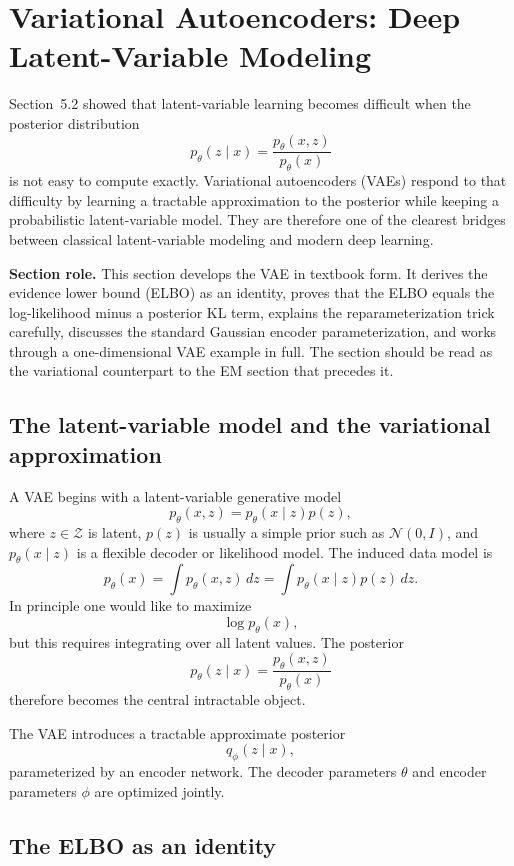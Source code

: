 \section{Variational Autoencoders: Deep Latent-Variable Modeling}

Section~5.2 showed that latent-variable learning becomes difficult when the posterior distribution
\[
p_\theta(z\mid x)=\frac{p_\theta(x,z)}{p_\theta(x)}
\]
is not easy to compute exactly.
Variational autoencoders (VAEs) respond to that difficulty by learning a tractable approximation to the posterior while keeping a probabilistic latent-variable model.
They are therefore one of the clearest bridges between classical latent-variable modeling and modern deep learning.

\medskip

\noindent
\textbf{Section role.}
This section develops the VAE in textbook form.
It derives the evidence lower bound (ELBO) as an identity, proves that the ELBO equals the log-likelihood minus a posterior KL term, explains the reparameterization trick carefully, discusses the standard Gaussian encoder parameterization, and works through a one-dimensional VAE example in full.
The section should be read as the variational counterpart to the EM section that precedes it.

\subsection*{The latent-variable model and the variational approximation}

A VAE begins with a latent-variable generative model
\[
p_\theta(x,z)=p_\theta(x\mid z)p(z),
\]
where $z\in \mathcal Z$ is latent, $p(z)$ is usually a simple prior such as $\mathcal N(0,I)$, and $p_\theta(x\mid z)$ is a flexible decoder or likelihood model.
The induced data model is
\[
p_\theta(x)=\int p_\theta(x,z)\,dz = \int p_\theta(x\mid z)p(z)\,dz.
\]
In principle one would like to maximize
\[
\log p_\theta(x),
\]
but this requires integrating over all latent values.
The posterior
\[
p_\theta(z\mid x)=\frac{p_\theta(x,z)}{p_\theta(x)}
\]
therefore becomes the central intractable object.

The VAE introduces a tractable approximate posterior
\[
q_\phi(z\mid x),
\]
parameterized by an encoder network.
The decoder parameters $\theta$ and encoder parameters $\phi$ are optimized jointly.

\subsection*{The ELBO as an identity}

